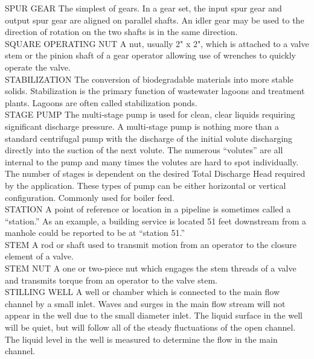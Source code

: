 \documentclass{article}
\begin{document}
SPUR GEAR
The simplest of gears. In a gear set, the input spur gear and output spur gear are aligned on parallel shafts. An idler gear may be used to the direction of rotation on the two shafts is in the same direction.
\vspace{0.3cm}\\
SQUARE OPERATING NUT
A nut, usually 2" x 2", which is attached to a valve stem or the pinion shaft of a gear operator allowing use of wrenches to quickly operate the valve.
\vspace{0.3cm}\\
STABILIZATION
The conversion of biodegradable materials into more stable solids. Stabilization is the primary function of wastewater lagoons and treatment plants. Lagoons are often called stabilization ponds.
\vspace{0.3cm}\\
STAGE PUMP
The multi-stage pump is used for clean, clear liquids requiring significant discharge pressure. A multi-stage pump is nothing more than a standard centrifugal pump with the discharge of the initial volute discharging directly into the suction of the next volute. The numerous “volutes” are all internal to the pump and many times the volutes are hard to spot individually. The number of stages is dependent on the desired Total Discharge Head required by the application. These types of pump can be either horizontal or vertical configuration. Commonly used for boiler feed.
\vspace{0.3cm}\\
STATION
A point of reference or location in a pipeline is sometimes called a “station.” As an example, a building service is located 51 feet downstream from a manhole could be reported to be at “station 51.” 
\vspace{0.3cm}\\
STEM
A rod or shaft used to transmit motion from an operator to the closure element of a valve.
\vspace{0.3cm}\\
STEM NUT
A one or two-piece nut which engages the stem threads of a valve and transmits torque from an operator to the valve stem.
\vspace{0.3cm}\\
STILLING WELL
A well or chamber which is connected to the main flow channel by a small inlet. Waves and surges in the main flow stream will not appear in the well due to the small diameter inlet. The liquid surface in the well will be quiet, but will follow all of the steady fluctuations of the open channel. The liquid level in the well is measured to determine the flow in the main channel. 
\end{document}
